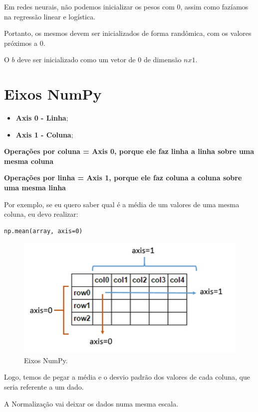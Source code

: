 \documentclass[12pt]{article}
\providecommand{\tightlist}{%
      \setlength{\itemsep}{0pt}\setlength{\parskip}{0pt}}
\begin{document}
Em redes neurais, não podemos inicializar os pesos com \(0\), assim como
fazíamos na regressão linear e logística.

Portanto, os mesmos devem ser inicializados de forma randômica, com os
valores próximos a 0.

O \(b\) deve ser inicializado como um vetor de \(0\) de dimensão
\(nx1\).


\hypertarget{eixos-numpy}{%
\section{Eixos NumPy}\label{eixos-numpy}}

\begin{itemize}
\tightlist
\item
  \textbf{Axis 0 - Linha};
\item
  \textbf{Axis 1 - Coluna};
\end{itemize}

\textbf{Operações por coluna = Axis 0, porque ele faz linha a linha
sobre uma mesma coluna}

\textbf{Operações por linha = Axis 1, porque ele faz coluna a coluna
sobre uma mesma linha}

    Por exemplo, se eu quero saber qual é a média de um valores de uma mesma
coluna, eu devo realizar:

\begin{verbatim}
np.mean(array, axis=0)
\end{verbatim}

\begin{figure}
  \centering
  \includegraphics[width=0.8\linewidth]{imgs/axis_numpy.jpg}
  \caption{Eixos NumPy.}
\end{figure}

    Logo, temos de pegar a média e o desvio padrão dos valores de cada
coluna, que seria referente a um dado.

    A Normalização vai deixar os dados numa mesma escala.
\end{document}
